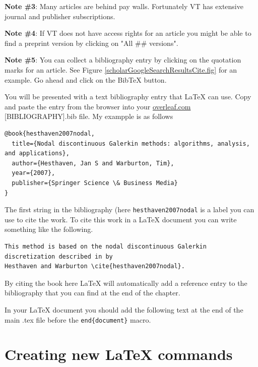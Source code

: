{\bf Note \#3}: Many articles are behind pay walls. Fortunately VT has extensive journal and publisher subscriptions.

{\bf Note \#4}: If VT does not have access rights for an article you might be able to find a preprint version by clicking on "All \#\# versions". 

{\bf Note \#5}: You can collect a bibliography entry by clicking on the quotation marks for an article. See Figure \ref{scholarGoogleSearchResultsCite.fig} for an example. Go ahead and click on the BibTeX button. 


You will be presented with a text bibliography entry that \LaTeX{} can use. Copy and paste the entry from the browser into your \href{https://overleaf.com}{overleaf.com} [BIBLIOGRAPHY].bib file. My exampple is as follows

\begin{verbatim}
@book{hesthaven2007nodal,
  title={Nodal discontinuous Galerkin methods: algorithms, analysis, and applications},
  author={Hesthaven, Jan S and Warburton, Tim},
  year={2007},
  publisher={Springer Science \& Business Media}
}
\end{verbatim}

The first string in the bibliography (here \texttt{hesthaven2007nodal} is a label you can use to cite the work. To cite this work in a \LaTeX{} document you can write something like the following.

\begin{verbatim}
This method is based on the nodal discontinuous Galerkin discretization described in by 
Hesthaven and Warburton \cite{hesthaven2007nodal}.
\end{verbatim}

By citing the book here \cite{hesthaven2007nodal} \LaTeX{} will automatically add a reference entry to the bibliography that you can find at the end of the chapter. 

In your \LaTeX{} document you should add the following text at the end of the main .tex file before the \texttt{end\{document\}} macro.

\section{Creating new \LaTeX{} commands}

